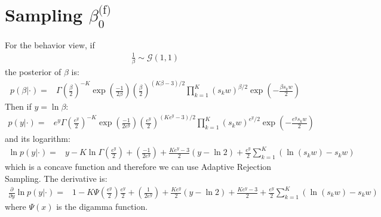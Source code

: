 \documentclass[smallextended]{svjour3}          %
\newcommand{\betaof}{\beta_{0}^\text{(f)}}
\begin{document}
\section{Sampling $\betaof$}
For the behavior view, if 
\begin{align*}
	\frac{1}{\beta} \sim \mathcal{G}(1,1)
\end{align*}
the posterior of $\beta$ is:
\begin{align*}
	p(\beta | \cdot) 
	=&  
	\Gamma(\frac{\beta}{2})^{-K}\exp\left(\frac{-1}{2\beta}\right) \left(\frac{\beta}{2}\right)
	^{(K \beta -3)/2}
	\prod_{k=1}^{K} (s_k w)^{\beta/2} \exp\left(-\frac{\beta s_k w}{2}\right)
\end{align*}
Then if $y=\ln\beta$:
\begin{align*}
	p(y | \cdot) =&  e^y \Gamma(\frac{e^y}{2})^{-K}\exp\left(\frac{-1}{2e^y}\right) \left(\frac{e^y}{2}\right)
	^{(K e^y -3)/2}
	\prod_{k=1}^{K} (s_k w)^{e^y/2} \exp\left(-\frac{e^y s_k w}{2}\right)
\end{align*}
and its logarithm:
\begin{align*}
	\ln p(y | \cdot) =& y -K\ln\Gamma \left(\frac{e^y}{2}\right) + \left(\frac{-1}{2e^y}\right)%
	+\frac{Ke^y-3}{2}\left(y - \ln2\right)%
	+ \frac{e^y}{2}\sum_{k=1}^{K} \left(\ln (s_k w) - s_k w \right)
\end{align*}
which is a concave function and therefore we can use Adaptive Rejection Sampling. The derivative is:
\begin{align*}
	\frac{\partial}{\partial y} \ln p(y | \cdot) =& 
	1 
	-K \Psi \left(\frac{e^y}{2}\right) \frac{e^y}{2}
	+ \left(\frac{1}{2e^y}\right)
	+\frac{Ke^y}{2} \left(y - \ln2\right) + \frac{Ke^y-3}{2}
	+ \frac{e^y}{2}\sum_{k=1}^{K}\left(\ln (s_k w) - s_k w\right)
\end{align*}
where $\Psi(x)$ is the digamma function.

\end{document}

